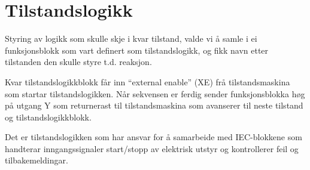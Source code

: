\newpage
\section{Tilstandslogikk}
\thispagestyle{fancy}

Styring av logikk som skulle skje i kvar tilstand, valde vi å samle i ei funksjonsblokk som vart definert som tilstandslogikk, og fikk navn etter tilstanden
den skulle styre t.d. reaksjon.

Kvar tilstandslogikkblokk får inn ``external enable'' (\gls{XE}) frå tilstandsmaskina som startar tilstandslogikken. Når sekvensen er ferdig sender
funksjonsblokka høg på utgang Y som returnerast til tilstandsmaskina som avanserer til neste tilstand og tilstandslogikkblokk.

Det er tilstandslogikken som har ansvar for å samarbeide med \gls{IEC}-blokkene som handterar inngangssignaler
start/stopp av elektrisk utstyr og kontrollerer feil og tilbakemeldingar. \newline \newline \newline

